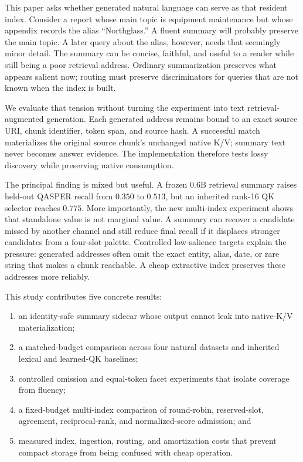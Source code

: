 \documentclass[11pt]{article}
\newcommand{\kv}{K/V\xspace}
\begin{document}
This paper asks whether generated natural language can serve as that resident
index. Consider a report whose main topic is equipment maintenance but whose
appendix records the alias ``Northglass.'' A fluent summary will probably
preserve the main topic. A later query about the alias, however, needs that
seemingly minor detail. The summary can be concise, faithful, and useful to a
reader while still being a poor retrieval address. Ordinary summarization
preserves what appears salient now; routing must preserve discriminators for
queries that are not known when the index is built.

We evaluate that tension without turning the experiment into text retrieval-augmented generation. Each generated address remains bound to an exact source URI, chunk identifier, token span, and source hash. A successful match materializes the original source chunk's unchanged native \kv; summary text never becomes answer evidence. The implementation therefore tests lossy discovery while preserving native consumption.

The principal finding is mixed but useful. A frozen 0.6B retrieval summary
raises held-out QASPER recall from $0.350$ to $0.513$, but an inherited rank-16
QK selector reaches $0.775$. More importantly, the new multi-index experiment
shows that standalone value is not marginal value. A summary can recover a
candidate missed by another channel and still reduce final recall if it
displaces stronger candidates from a four-slot palette. Controlled
low-salience targets explain the pressure: generated addresses often omit the
exact entity, alias, date, or rare string that makes a chunk reachable. A cheap
extractive index preserves these addresses more reliably.

This study contributes five concrete results:
\begin{enumerate}[leftmargin=*]
\item an identity-safe summary sidecar whose output cannot leak into native-\kv materialization;
\item a matched-budget comparison across four natural datasets and inherited lexical and learned-QK baselines;
\item controlled omission and equal-token facet experiments that isolate coverage from fluency;
\item a fixed-budget multi-index comparison of round-robin, reserved-slot,
agreement, reciprocal-rank, and normalized-score admission; and
\item measured index, ingestion, routing, and amortization costs that prevent compact storage from being confused with cheap operation.
\end{enumerate}
\end{document}
